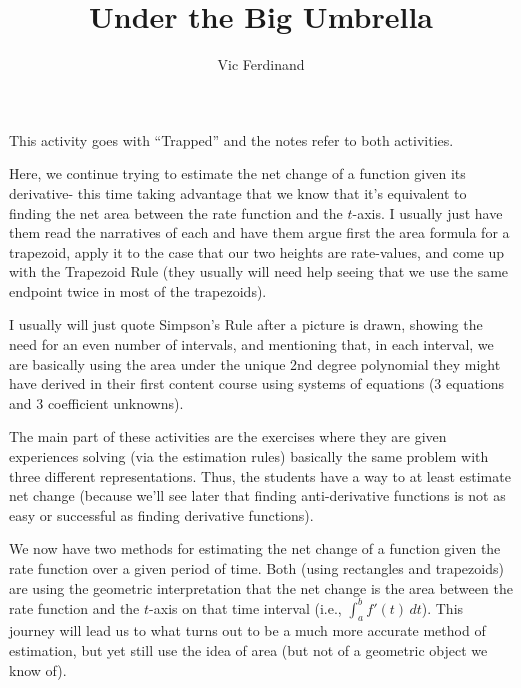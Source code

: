 \documentclass{ximera}
\author{Vic Ferdinand}
\title{Under the Big Umbrella}
\begin{document}
\begin{abstract}
\end{abstract}
\maketitle


\begin{instructorIntro}
This activity goes with ``Trapped'' and the notes refer to both activities.

Here, we continue trying to estimate the net change of a function given its derivative- this time taking advantage that we know that it's equivalent to finding the net area between the rate function and the $t$-axis.  I usually just have them read the narratives of each and have them argue first the area formula for a trapezoid, apply it to the case that our two heights are rate-values, and come up with the Trapezoid Rule (they usually will need help seeing that we use the same endpoint twice in most of the trapezoids).  

I usually will just quote Simpson's Rule after a picture is drawn, showing the need for an even number of intervals, and mentioning that, in each interval, we are basically using the area under the unique 2nd degree polynomial they might have derived in their first content course using systems of equations (3 equations and 3 coefficient unknowns).

The main part of these activities are the exercises where they are given experiences solving (via the estimation rules) basically the same problem with three different representations.
Thus, the students have a way to at least estimate net change (because we'll see later that finding anti-derivative functions is not as easy or successful as finding derivative functions). 
\newpage
\end{instructorIntro}


We now have two methods for estimating the net change of a function given the rate function over a given period of time.  Both (using rectangles and trapezoids) are using the geometric interpretation that the net change is the area between the rate function and the $t$-axis on that time interval (i.e.,  $\int_a^b f'(t)\, dt$).  This journey will lead us to what turns out to be a much more accurate method of estimation, but yet still use the idea of area (but not of a geometric object we know of).
\end{document}
